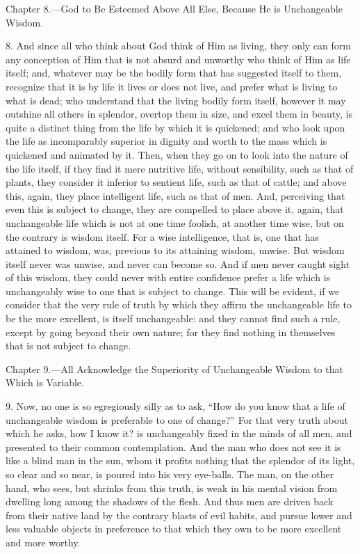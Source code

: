 
Chapter 8.—God to Be Esteemed Above All Else, Because He is Unchangeable Wisdom.

8. And since all who think about God think of Him as living, they only can form any conception of Him that is not absurd and unworthy who think of Him as life itself; and, whatever may be the bodily form that has suggested itself to them, recognize that it is by life it lives or does not live, and prefer what is living to what is dead; who understand that the living bodily form itself, however it may outshine all others in splendor, overtop them  in size, and excel them in beauty, is quite a distinct thing from the life by which it is quickened; and who look upon the life as incomparably superior in dignity and worth to the mass which is quickened and animated by it. Then, when they go on to look into the nature of the life itself, if they find it mere nutritive life, without sensibility, such as that of plants, they consider it inferior to sentient life, such as that of cattle; and above this, again, they place intelligent life, such as that of men. And, perceiving that even this is subject to change, they are compelled to place above it, again, that unchangeable life which is not at one time foolish, at another time wise, but on the contrary is wisdom itself. For a wise intelligence, that is, one that has attained to wisdom, was, previous to its attaining wisdom, unwise. But wisdom itself never was unwise, and never can become so. And if men never caught sight of this wisdom, they could never with entire confidence prefer a life which is unchangeably wise to one that is subject to change. This will be evident, if we consider that the very rule of truth by which they affirm the unchangeable life to be the more excellent, is itself unchangeable: and they cannot find such a rule, except by going beyond their own nature; for they find nothing in themselves that is not subject to change.


Chapter 9.—All Acknowledge the Superiority of Unchangeable Wisdom to that Which is Variable.

9. Now, no one is so egregiously silly as to ask, “How do you know that a life of unchangeable wisdom is preferable to one of change?” For that very truth about which he asks, how I know it? is unchangeably fixed in the minds of all men, and presented to their common contemplation. And the man who does not see it is like a blind man in the sun, whom it profits nothing that the splendor of its light, so clear and so near, is poured into his very eye-balls. The man, on the other hand, who sees, but shrinks from this truth, is weak in his mental vision from dwelling long among the shadows of the flesh. And thus men are driven back from their native land by the contrary blasts of evil habits, and pursue lower and less valuable objects in preference to that which they own to be more excellent and more worthy.

